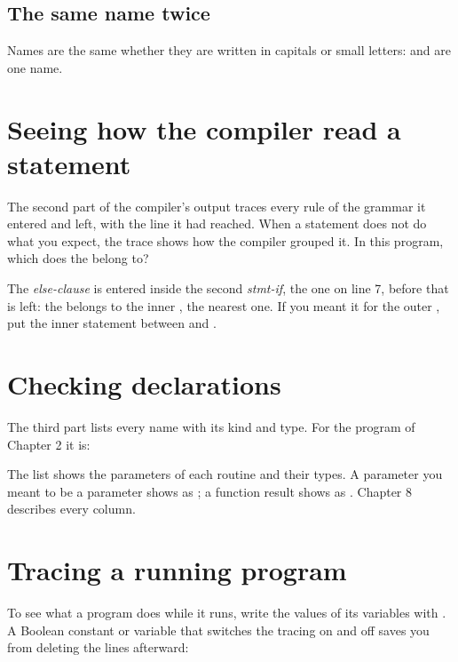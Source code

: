 \subsection{The same name twice}
Names are the same whether they are written in capitals or small letters:
 and  are one name.

\section{Seeing how the compiler read a statement}
The second part of the compiler's output traces every rule of the grammar
it entered and left, with the line it had reached.  When a statement does
not do what you expect, the trace shows how the compiler grouped it.  In
this program, which  does the  belong to?




The \textit{else-clause} is entered inside the second \textit{stmt-if}, the
one on line 7, before that  is left: the  belongs to the
inner , the nearest one.  If you meant it for the outer ,
put the inner  statement between  and .

\section{Checking declarations}
The third part lists every name with its kind and type.  For the program
 of Chapter 2 it is:


The list shows the parameters of each routine and their types.  A
parameter you meant to be a  parameter shows as
; a function result shows as .  Chapter 8
describes every column.

\section{Tracing a running program}
To see what a program does while it runs, write the values of its
variables with .  A Boolean constant or variable
that switches the tracing on and off saves you from deleting the lines
afterward:

